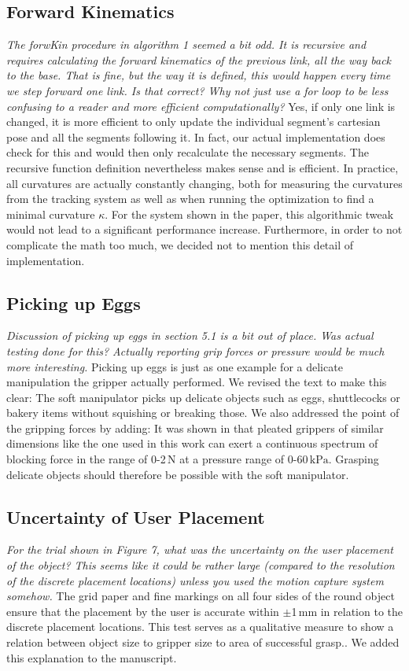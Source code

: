 \documentclass[letterpaper, 10 pt, twocolumn, conference]{article}
\newcommand{\unit}[1]{\ensuremath{\, \mathrm{#1}}} %
\begin{document}
\subsection{Forward Kinematics}
\textit{The forwKin procedure in algorithm 1 seemed a bit odd. It is recursive and requires calculating the forward kinematics of the previous link, all the way back to the base. That is fine, but the way it is defined, this would happen every time we step forward one link. Is that correct? Why not just use a for loop to be less confusing to a reader and more efficient computationally?}
%
Yes, if only one link is changed, it is more efficient to only update the individual segment's cartesian pose and all the segments following it. In fact, our actual implementation does check for this and would then only recalculate the necessary segments.  The recursive function definition nevertheless makes sense and is efficient. In practice, all curvatures are actually constantly changing, both for measuring the curvatures from the tracking system as well as when running the optimization to find a minimal curvature $\kappa$. For the system shown in the paper, this algorithmic tweak would not lead to a significant performance increase. Furthermore, in order to not complicate the math too much, we decided not to mention this detail of implementation. 
%
\subsection{Picking up Eggs}
\textit{Discussion of picking up eggs in section 5.1 is a bit out of place. Was actual testing done for this? Actually reporting grip forces or pressure would be much more interesting.}
%
Picking up eggs is just as one example for a delicate manipulation the gripper actually performed. We revised the text to make this clear:
The soft manipulator picks up delicate objects such as eggs, shuttlecocks or bakery items without squishing or breaking those. 
We also addressed the point of the gripping forces by adding:
It was shown in \cite{marchese2015recipe} that pleated grippers of similar dimensions like the one used in this work can exert a continuous spectrum of blocking force in the range of 0-2\unit{N} at a pressure range of 0-60\unit{kPa}. Grasping delicate objects should therefore be possible with the soft manipulator.
%
\subsection{Uncertainty of User Placement}
\textit{For the trial shown in Figure 7, what was the uncertainty on the user placement of the object? This seems like it could be rather large (compared to the resolution of the discrete placement locations) unless you used the motion capture system somehow.}
%
The grid paper and fine markings on all four sides of the round object ensure that the placement by the user is accurate within $\pm$1\unit{mm} in relation to the discrete placement locations. This test serves as a qualitative measure to show a relation between object size to gripper size to area of successful grasp.. We added this explanation to the manuscript. 
%
\end{document}
